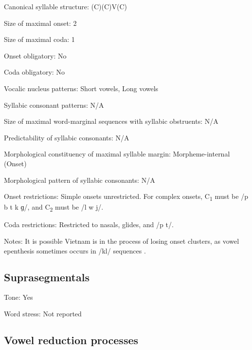 {\begin{appendixdesc}
\item[Canonical syllable structure:] (C)(C)V(C) \citep[123--127]{Clark2008}

\item[Size of maximal onset:] 2

\item[Size of maximal coda:] 1

\item[Onset obligatory:] No

\item[Coda obligatory:] No

\item[Vocalic nucleus patterns:] Short vowels, Long vowels

\item[Syllabic consonant patterns:] N/A

\item[Size of maximal word-marginal sequences with syllabic obstruents:] N/A

\item[Predictability of syllabic consonants:] N/A

\item[Morphological constituency of maximal syllable margin:] Morpheme-internal (Onset)

\item[Morphological pattern of syllabic consonants:] N/A

\item[Onset restrictions:] Simple onsets unrestricted. For complex onsets, C\textsubscript{1} must be /p b t k ɡ/, and C\textsubscript{2} must be /l w j/. 

\item[Coda restrictions:] Restricted to nasals, glides, and /p t/.

\item[Notes:] It is possible Vietnam  is in the process of losing onset clusters, as vowel epenthesis sometimes occurs in /kl/ sequences \citep[127]{Clark2008}.
\end{appendixdesc}
\subsection*{Suprasegmentals}
\begin{appendixdesc}
\item[Tone:] Yes

\item[Word stress:] Not reported
\end{appendixdesc}
\subsection*{Vowel reduction processes}
\begin{appendixdesc}


\end{appendixdesc}}
